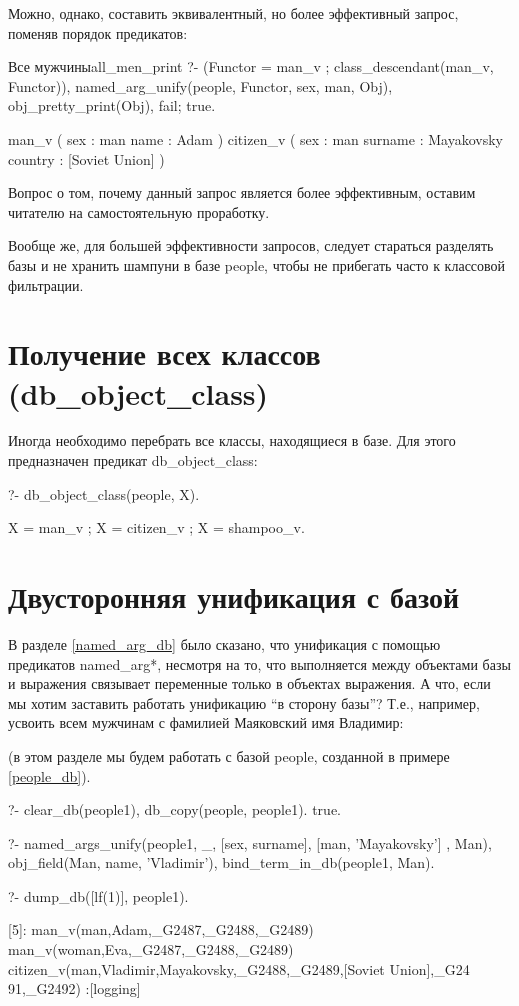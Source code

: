 \documentclass[a4paper]{book}
\def\Te{Т.\thinspace е.}
\def\na{named\_arg*}
\begin{document}
Можно, однако, составить эквивалентный, но более эффективный
запрос, поменяв порядок предикатов:

\begin{example}{Все мужчины}{all_men_print}
?- (Functor = man_v ; class_descendant(man_v, Functor)), 
   named_arg_unify(people, Functor, sex, man, Obj), 
   obj_pretty_print(Obj), fail; true.

man_v ( 
  sex : man 
  name : Adam 
) 
citizen_v ( 
  sex : man 
  surname : Mayakovsky 
  country : [Soviet Union] 
) 
\end{example}

Вопрос о том, почему данный запрос является более эффективным,
оставим читателю на самостоятельную проработку.

Вообще же, для большей эффективности запросов, следует стараться
разделять базы и не хранить шампуни в базе people, чтобы не
прибегать часто к классовой фильтрации.

\section{Получение всех классов (db\_object\_class)}
\label{db_object_class}

Иногда необходимо перебрать все классы, находящиеся в базе. Для
этого предназначен предикат db\_object\_class:

\begin{example}{}{}
?- db_object_class(people, X).

X = man_v ;
X = citizen_v ;
X = shampoo_v.
\end{example}

\section{Двусторонняя унификация с базой}
\label{bind_term_in_db}

В разделе \ref{named_arg_db} было сказано, что унификация с
помощью предикатов \na{}, несмотря на то, что выполняется между
объектами базы и выражения связывает переменные только в объектах
выражения. А что, если мы хотим заставить работать унификацию ``в
сторону базы''? \Te, например, усвоить всем мужчинам с фамилией
Маяковский имя Владимир:

(в этом разделе мы будем работать с базой people, созданной в
примере \ref{people_db}).

\begin{example}{}{}
?- clear_db(people1), db_copy(people, people1).
true.

?- named_args_unify(people1, _, 
      [sex, surname], [man, 'Mayakovsky'] , Man), 
   obj_field(Man, name, 'Vladimir'), 
   bind_term_in_db(people1, Man).

?- dump_db([lf(1)], people1).

[5]: man_v(man,Adam,_G2487,_G2488,_G2489) 
man_v(woman,Eva,_G2487,_G2488,_G2489) 
citizen_v(man,Vladimir,Mayakovsky,_G2488,_G2489,[Soviet Union],_G24
91,_G2492)                                                        
 :[logging]
\end{example}
\end{document}

